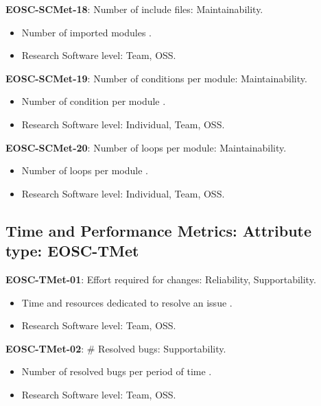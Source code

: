 \textbf{EOSC-SCMet-18}: Number of include files: Maintainability.

\begin{itemize}
    \item Number of imported modules \cite{ogasawara_experiences_1996}.
    \item Research Software level: Team, OSS.
\end{itemize}

\textbf{EOSC-SCMet-19}: Number of conditions per module: Maintainability.

\begin{itemize}
    \item Number of condition per module \cite{ogasawara_experiences_1996}.
    \item Research Software level: Individual, Team, OSS.
\end{itemize}

\textbf{EOSC-SCMet-20}: Number of loops per module: Maintainability.

\begin{itemize}
    \item Number of loops per module \cite{ogasawara_experiences_1996}.
    \item Research Software level: Individual, Team, OSS.
\end{itemize}

\subsection{Time and Performance Metrics: Attribute type: EOSC-TMet}

\textbf{EOSC-TMet-01}: Effort required for changes: Reliability, Supportability.

\begin{itemize}
    \item Time and resources dedicated to resolve an issue \cite{montagud_systematic_2012}.
    \item Research Software level: Team, OSS.
\end{itemize}

\textbf{EOSC-TMet-02}: \# Resolved bugs: Supportability.

\begin{itemize}
    \item Number of resolved bugs per period of time \cite{montagud_systematic_2012}.
    \item Research Software level: Team, OSS.
\end{itemize}

